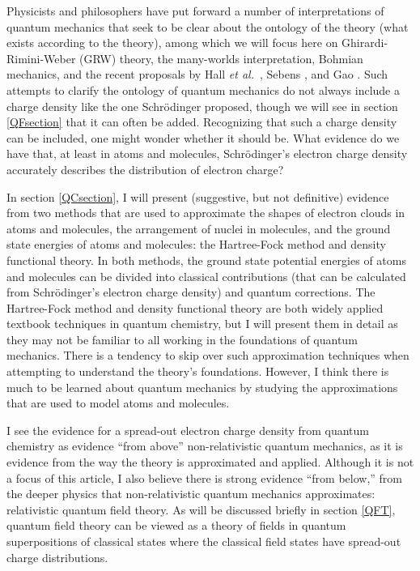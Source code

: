 \documentclass[12pt,onecolumn,secnumarabic,amsmath,amssymb,balancelastpage,nofootinbib]{article}
\begin{document}
Physicists and philosophers have put forward a number of interpretations of quantum mechanics that seek to be clear about the ontology of the theory (what exists according to the theory), among which we will focus here on Ghirardi-Rimini-Weber (GRW) theory, the many-worlds interpretation, Bohmian mechanics, and the recent proposals by Hall \emph{et al.}\ \cite{HDW}, Sebens \cite{sebens2015}, and Gao \cite{gao2014, gao2017, gao2018, gao2020}.  Such attempts to clarify the ontology of quantum mechanics do not always include a charge density like the one Schr\"{o}dinger proposed, though we will see in section \ref{QFsection} that it can often be added.  Recognizing that such a charge density can be included, one might wonder whether it should be.  What evidence do we have that, at least in atoms and molecules, Schr\"{o}dinger's electron charge density accurately describes the distribution of electron charge?

In section \ref{QCsection}, I will present (suggestive, but not definitive) evidence from two methods that are used to approximate the shapes of electron clouds in atoms and molecules, the arrangement of nuclei in molecules, and the ground state energies of atoms and molecules: the Hartree-Fock method and density functional theory.  In both methods, the ground state potential energies of atoms and molecules can be divided into classical contributions (that can be calculated from Schr\"{o}dinger's electron charge density) and quantum corrections.  The Hartree-Fock method and density functional theory are both widely applied textbook techniques in quantum chemistry, but I will present them in detail as they may not be familiar to all working in the foundations of quantum mechanics.  There is a tendency to skip over such approximation techniques when attempting to understand the theory's foundations.  However, I think there is much to be learned about quantum mechanics by studying the approximations that are used to model atoms and molecules.

I see the evidence for a spread-out electron charge density from quantum chemistry as evidence ``from above'' non-relativistic quantum mechanics, as it is evidence from the way the theory is approximated and applied.  Although it is not a focus of this article, I also believe there is strong evidence ``from below,'' from the deeper physics that non-relativistic quantum mechanics approximates: relativistic quantum field theory.  As will be discussed briefly in section \ref{QFT}, quantum field theory can be viewed as a theory of fields in quantum superpositions of classical states where the classical field states have spread-out charge distributions.
\end{document}
